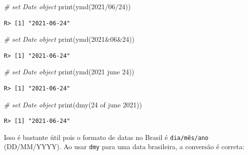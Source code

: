 \documentclass[
  11pt,
]{book}
\newenvironment{Shaded}{\begin{snugshade}}{\end{snugshade}}
\newcommand{\CommentTok}[1]{\textcolor[rgb]{0.37,0.37,0.37}{\textit{#1}}}
\newcommand{\FunctionTok}[1]{\textcolor[rgb]{0,0,0}{#1}}
\newcommand{\NormalTok}[1]{#1}
\newcommand{\StringTok}[1]{\textcolor[rgb]{0.5,0.5,0.5}{#1}}
\begin{document}
\begin{Shaded}
\begin{Highlighting}[]
\CommentTok{\# set Date object}
\FunctionTok{print}\NormalTok{(}\FunctionTok{ymd}\NormalTok{(}\StringTok{\textquotesingle{}2021/06/24\textquotesingle{}}\NormalTok{))}
\end{Highlighting}
\end{Shaded}

\begin{verbatim}
R> [1] "2021-06-24"
\end{verbatim}

\begin{Shaded}
\begin{Highlighting}[]
\CommentTok{\# set Date object}
\FunctionTok{print}\NormalTok{(}\FunctionTok{ymd}\NormalTok{(}\StringTok{\textquotesingle{}2021\&06\&24\textquotesingle{}}\NormalTok{))}
\end{Highlighting}
\end{Shaded}

\begin{verbatim}
R> [1] "2021-06-24"
\end{verbatim}

\begin{Shaded}
\begin{Highlighting}[]
\CommentTok{\# set Date object}
\FunctionTok{print}\NormalTok{(}\FunctionTok{ymd}\NormalTok{(}\StringTok{\textquotesingle{}2021 june 24\textquotesingle{}}\NormalTok{))}
\end{Highlighting}
\end{Shaded}

\begin{verbatim}
R> [1] "2021-06-24"
\end{verbatim}

\begin{Shaded}
\begin{Highlighting}[]
\CommentTok{\# set Date object}
\FunctionTok{print}\NormalTok{(}\FunctionTok{dmy}\NormalTok{(}\StringTok{\textquotesingle{}24 of june 2021\textquotesingle{}}\NormalTok{))}
\end{Highlighting}
\end{Shaded}

\begin{verbatim}
R> [1] "2021-06-24"
\end{verbatim}

Isso é bastante útil pois o formato de datas no Brasil é \texttt{dia/mês/ano} (DD/MM/YYYY). Ao usar \texttt{dmy} para uma data brasileira, a conversão é correta:
\end{document}
